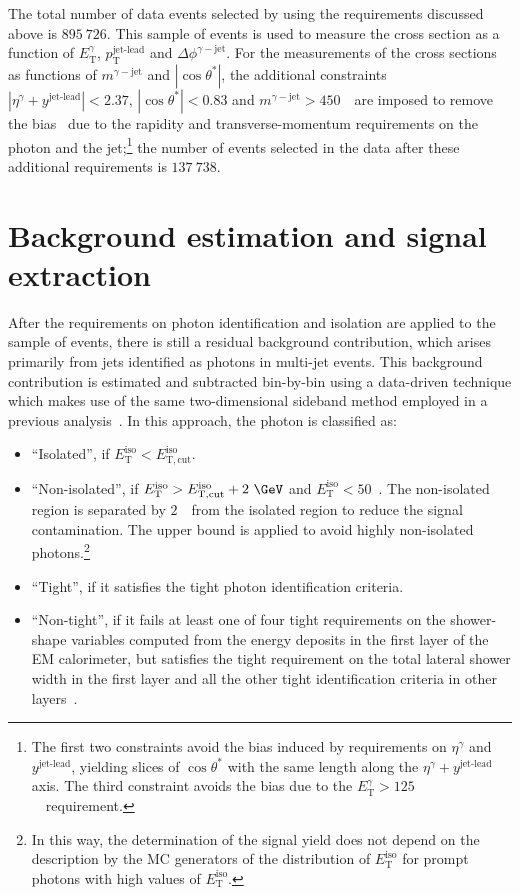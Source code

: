 \documentclass[cernpreprint,texlive=2016,txfonts,UKenglish]{latex/atlasdoc}
\def\ptjetl{p_{\mathrm{T}}^{\text{jet-lead}}}
\def\etg{E_{\mathrm{T}}^{\gamma}}
\def\etag{\eta^{\gamma}}
\def\mgj{m^{\gamma-{\mathrm{jet}}}}
\def\ctgj{\cos\theta^*}
\def\deltaphigj{\Delta\phi^{\gamma-{\mathrm{jet}}}}
\def\etiso{E_{\mathrm{T}}^{\mathrm{iso}}}
\def\etisoc{E_{\mathrm{T,cut}}^{\mathrm{iso}}}
\def\rapjetl{y^{\text{jet-lead}}}
\begin{document}
The total number of data events selected by using the requirements
discussed above is $895\ 726$.  This sample of events is used to
measure the cross section as a function of $\etg$, $\ptjetl$ and
$\deltaphigj$. For the measurements of the cross sections as functions
of $\mgj$ and $|\ctgj|$, the additional constraints
$|\etag+\rapjetl|<2.37$, $|\ctgj|<0.83$ and $\mgj>450$~\GeV\ are
imposed to remove the bias~\cite{np:b875:483,np:b918:257} due to the
rapidity and transverse-momentum requirements on the photon and the
jet;\footnote{The first two constraints avoid the bias induced by
  requirements on $\etag$ and $\rapjetl$, yielding slices of $\ctgj$
  with the same length along the $\etag+\rapjetl$ axis. The third
  constraint avoids the bias due to the $\etg>125$~\GeV\ requirement.}
the number of events selected in the data after these additional
requirements is $137\ 738$.

\section{Background estimation and signal extraction}
\label{bacsub}
After the requirements on photon identification and isolation are
applied to the sample of events, there is still a residual background
contribution, which arises primarily from jets identified as photons
in multi-jet events. This background contribution is estimated and
subtracted bin-by-bin using a data-driven technique which makes use of
the same two-dimensional sideband method employed in a previous
analysis~\cite{pl:b770:473}. In this approach, the photon is
classified as:
\begin{itemize}
\item ``Isolated'', if $\etiso<\etisoc$.
\item ``Non-isolated'', if $\etiso>\etisoc +2\ {\mathrm{\GeV}}$ and
  $\etiso< 50$~\GeV. The non-isolated region is separated by $2$~\GeV\
  from the isolated region to reduce the signal contamination. The
  upper bound is applied to avoid highly non-isolated
  photons.\footnote{In this way, the determination of the signal yield
    does not depend on the description by the MC generators of the
    distribution of $\etiso$ for prompt photons with high values of
    $\etiso$.} 
\item ``Tight'', if it satisfies the tight photon identification criteria.
\item ``Non-tight'', if it fails at least one of four tight
  requirements on the shower-shape variables computed from the energy
  deposits in the first layer of the EM calorimeter, but satisfies the
  tight requirement on the total lateral shower width in the first
  layer and all the other tight identification criteria in other
  layers~\cite{epj:c76:666}.
\end{itemize}
\end{document}
